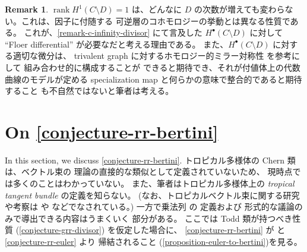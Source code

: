 \documentclass[a4paper,dvipdfmx,reqno,12pt]{amsart}
\theoremstyle{definition}
\newtheorem{remark}[theorem]{Remark}
\newcommand{\opn}[1]{\operatorname{#1}}
\numberwithin{equation}{section}
\begin{document}
\begin{remark}
$\opn{rank} H^{1}(C\setminus D)=1$ は、どんなに $D$
の次数が増えても変わらない。これは、因子に付随する
可逆層のコホモロジーの挙動とは異なる性質である。
これが、\cref{remark-c-infinity-divisor} にて言及した
$H^{\bullet}(C\setminus D)$ に対して ``Floer differential''
が必要なだと考える理由である。
また、$H^{\bullet}(C\setminus D)$ に対する適切な微分は、
trivalent graph に対するホモロジー的ミラー対称性
\cite{auroux2022lagrangian} を参考にして
組み合わせ的に構成することが
できると期待でき、それが付値体上の代数曲線のモデルが定める
specialization map と何らかの意味で整合的であると期待すること
も不自然ではないと筆者は考える。
\end{remark}


\section{On \cref{conjecture-rr-bertini}}
\label{section-on-rr-bertini}
In this section, we discuss \cref{conjecture-rr-bertini}.
トロピカル多様体の Chern 類は、ベクトル束の
理論の直接的な類似として定義されていないため、
現時点では多くのことはわかっていない。
また、筆者はトロピカル多様体上の
\emph{tropical tangent bundle} の定義を知らない。
(なお、トロピカルベクトル束に関する研究や考察は
\cite{MR2961320,MR4646329}
や \cite[Theorem 1.8]{amini2020hodge}
などでなされている。)
一方で乗法列 \cite[]{MR1335917} の
定義および
形式的な議論のみで導出できる内容はうまくいく
部分がある。
ここでは Todd 類が持つべき性質
(\cref{conjecture-grr-divisor})
を仮定した場合に、
\cref{conjecture-rr-bertini} 
が\cite[Conjecture 6.13]{demedrano2023chern}
と\cref{conjecture-rr-euler} より
帰結されること
(\cref{proposition-euler-to-bertini})を見る。
\end{document}
